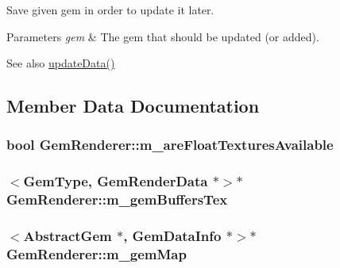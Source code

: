 Save given gem in order to update it later. 


\begin{DoxyParams}{Parameters}
{\em gem} & The gem that should be updated (or added). \\
\hline
\end{DoxyParams}
\begin{DoxySeeAlso}{See also}
\hyperlink{class_gem_renderer_ada5ea2f54e918b16879d378cf84dab42}{update\+Data()} 
\end{DoxySeeAlso}


\subsection{Member Data Documentation}
\hypertarget{class_gem_renderer_a09205046ea644ba35327843b208af1de}{}
\subsubsection[{m\+\_\+are\+Float\+Textures\+Available}]{\setlength{\rightskip}{0pt plus 5cm}bool Gem\+Renderer\+::m\+\_\+are\+Float\+Textures\+Available\hspace{0.3cm}{\ttfamily [protected]}}\label{class_gem_renderer_a09205046ea644ba35327843b208af1de}
\hypertarget{class_gem_renderer_ac09a5c2581e1500071429a833cf2bc56}{}
\subsubsection[{m\+\_\+gem\+Buffers\+Tex}]{$<${\bf Gem\+Type}, Gem\+Render\+Data $\ast$$>$$\ast$ Gem\+Renderer\+::m\+\_\+gem\+Buffers\+Tex\hspace{0.3cm}{\ttfamily [protected]}}\label{class_gem_renderer_ac09a5c2581e1500071429a833cf2bc56}
\hypertarget{class_gem_renderer_a549290c95d8ca95b163ca0fae08e11c8}{}
\subsubsection[{m\+\_\+gem\+Map}]{$<${\bf Abstract\+Gem} $\ast$, Gem\+Data\+Info $\ast$$>$$\ast$ Gem\+Renderer\+::m\+\_\+gem\+Map\hspace{0.3cm}{\ttfamily [protected]}}\label{class_gem_renderer_a549290c95d8ca95b163ca0fae08e11c8}
\hypertarget{class_gem_renderer_a1c7545294804fd500e8e02ce106bb6ba}{}

